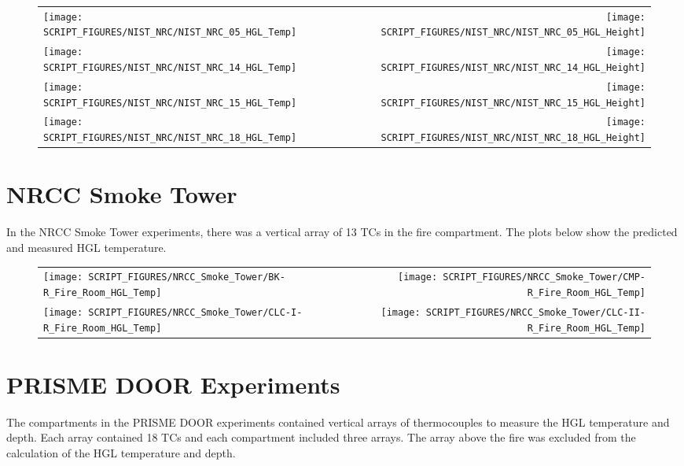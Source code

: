 \begin{figure}[p]
\begin{tabular*}{\textwidth}{l@{\extracolsep{\fill}}r}
\texttt{[image: SCRIPT\_FIGURES/NIST\_NRC/NIST\_NRC\_05\_HGL\_Temp]} &
\texttt{[image: SCRIPT\_FIGURES/NIST\_NRC/NIST\_NRC\_05\_HGL\_Height]} \\
\texttt{[image: SCRIPT\_FIGURES/NIST\_NRC/NIST\_NRC\_14\_HGL\_Temp]} &
\texttt{[image: SCRIPT\_FIGURES/NIST\_NRC/NIST\_NRC\_14\_HGL\_Height]} \\
\texttt{[image: SCRIPT\_FIGURES/NIST\_NRC/NIST\_NRC\_15\_HGL\_Temp]} &
\texttt{[image: SCRIPT\_FIGURES/NIST\_NRC/NIST\_NRC\_15\_HGL\_Height]} \\
\texttt{[image: SCRIPT\_FIGURES/NIST\_NRC/NIST\_NRC\_18\_HGL\_Temp]} &
\texttt{[image: SCRIPT\_FIGURES/NIST\_NRC/NIST\_NRC\_18\_HGL\_Height]}
\end{tabular*}
\end{figure}


\clearpage

\section{NRCC Smoke Tower}

In the NRCC Smoke Tower experiments, there was a vertical array of 13 TCs in the fire compartment. The plots below show the predicted and measured HGL temperature. 

\begin{figure}[!ht]
\begin{tabular*}{\textwidth}{l@{\extracolsep{\fill}}r}
\texttt{[image: SCRIPT\_FIGURES/NRCC\_Smoke\_Tower/BK-R\_Fire\_Room\_HGL\_Temp]} &
\texttt{[image: SCRIPT\_FIGURES/NRCC\_Smoke\_Tower/CMP-R\_Fire\_Room\_HGL\_Temp]} \\
\texttt{[image: SCRIPT\_FIGURES/NRCC\_Smoke\_Tower/CLC-I-R\_Fire\_Room\_HGL\_Temp]} &
\texttt{[image: SCRIPT\_FIGURES/NRCC\_Smoke\_Tower/CLC-II-R\_Fire\_Room\_HGL\_Temp]}
\end{tabular*}
\label{NRCC_Smoke_Tower_HGL_Temp}
\end{figure}


\clearpage

\section{PRISME DOOR Experiments}

The compartments in the PRISME DOOR experiments contained vertical arrays of thermocouples to measure the HGL temperature and depth. Each array contained 18 TCs and each compartment included three arrays. The array above the fire was excluded from the calculation of the HGL temperature and depth.

